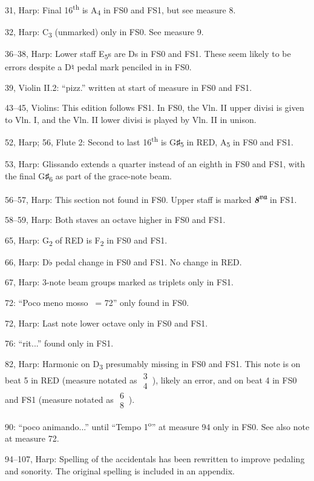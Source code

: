 \documentclass[twoside]{article}
\begin{document}
\begin{hangparas}{15pt}{1}
\begin{multicols}{2}
31, Harp: Final 16\textsuperscript{th} is A\textsubscript{4} in FS0 and FS1, but see measure 8.

32, Harp: C\textsubscript{3} (unmarked) only in FS0. See measure 9.

36--38, Harp: Lower staff E\textsubscript{5}s are Ds in FS0 and FS1. These seem likely to be errors despite a D♮ pedal mark penciled in in FS0.

39, Violin II.2: ``pizz.'' written at start of measure in FS0 and FS1.

43--45, Violins: This edition follows FS1. In FS0, the Vln. II upper divisi is given to Vln. I, and the Vln. II lower divisi is played by Vln. II in unison.

52, Harp; 56, Flute 2: Second to last 16\textsuperscript{th} is G♯\textsubscript{5} in RED, A\textsubscript{5} in FS0 and FS1.

53, Harp: Glissando extends a quarter instead of an eighth in FS0 and FS1, with the final G♯\textsubscript{6} as part of the grace-note beam.

56--57, Harp: This section not found in FS0. Upper staff is marked \textit{\textbf{8\textsuperscript{va}}} in FS1.

58--59, Harp: Both staves an octave higher in FS0 and FS1.

65, Harp: G\textsubscript{2} of RED is F\textsubscript{2} in FS0 and FS1.

66, Harp: D♭ pedal change in FS0 and FS1. No change in RED.

67, Harp: 3-note beam groups marked as triplets only in FS1.

72: ``Poco meno mosso \Vier\ = 72'' only found in FS0.

72, Harp: Last note lower octave only in FS0 and FS1.

76: ``rit...'' found only in FS1.

82, Harp: Harmonic on D\textsubscript{3} presumably missing in FS0 and FS1. This note is on beat 5 in RED (measure notated as $\substack{3\\4}$\,), likely an error, and on beat 4 in FS0 and FS1 (measure notated as $\substack{6\\8}$\,).

90: ``poco animando...'' until ``Tempo 1\textsuperscript{o}'' at measure 94 only in FS0. See also note at measure 72.

94--107, Harp: Spelling of the accidentals has been rewritten to improve pedaling and sonority. The original spelling is included in an appendix.


\end{multicols}
\end{hangparas}
\end{document}
